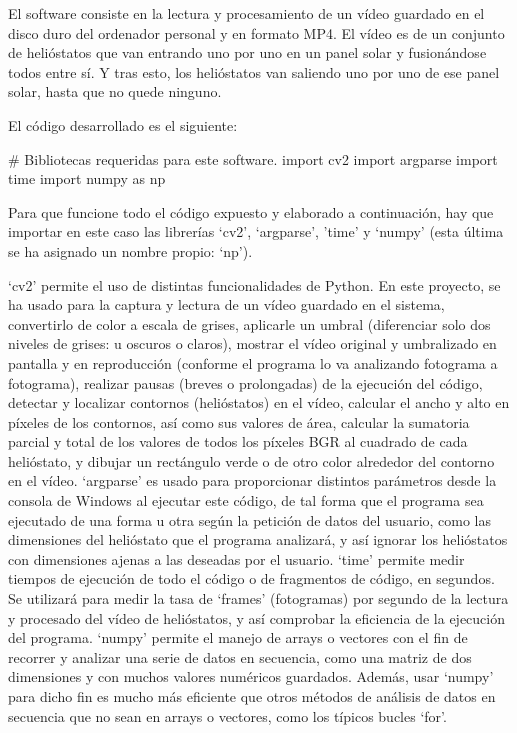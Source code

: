 El software consiste en la lectura y procesamiento de un vídeo guardado en el disco duro del ordenador personal y en formato MP4. El vídeo es de un conjunto de helióstatos que van entrando uno por uno en un panel solar y fusionándose todos entre sí. Y tras esto, los helióstatos van saliendo uno por uno de ese panel solar, hasta que no quede ninguno.

El código desarrollado es el siguiente:

\# Bibliotecas requeridas para este software.
import cv2
import argparse
import time
import numpy as np

Para que funcione todo el código expuesto y elaborado a continuación, hay que importar en este caso las librerías ‘cv2’, ‘argparse’, 'time' y ‘numpy’ (esta última se ha asignado un nombre propio: ‘np’).

‘cv2’ permite el uso de distintas funcionalidades de Python. En este proyecto, se ha usado para la captura y lectura de un vídeo guardado en el sistema, convertirlo de color a escala de grises, aplicarle un umbral (diferenciar solo dos niveles de grises: u oscuros o claros), mostrar el vídeo original y umbralizado en pantalla y en reproducción (conforme el programa lo va analizando fotograma a fotograma), realizar pausas (breves o prolongadas) de la ejecución del código, detectar y localizar contornos (helióstatos) en el vídeo, calcular el ancho y alto en píxeles de los contornos, así como sus valores de área, calcular la sumatoria parcial y total de los valores de todos los píxeles BGR al cuadrado de cada helióstato, y dibujar un rectángulo verde o de otro color alrededor del contorno en el vídeo.
‘argparse’ es usado para proporcionar distintos parámetros desde la consola de Windows al ejecutar este código, de tal forma que el programa sea ejecutado de una forma u otra según la petición de datos del usuario, como las dimensiones del helióstato que el programa analizará, y así ignorar los helióstatos con dimensiones ajenas a las deseadas por el usuario.
‘time’ permite medir tiempos de ejecución de todo el código o de fragmentos de código, en segundos. Se utilizará para medir la tasa de ‘frames’ (fotogramas) por segundo de la lectura y procesado del vídeo de helióstatos, y así comprobar la eficiencia de la ejecución del programa.
‘numpy’ permite el manejo de arrays o vectores con el fin de recorrer y analizar una serie de datos en secuencia, como una matriz de dos dimensiones y con muchos valores numéricos guardados. Además, usar ‘numpy’ para dicho fin es mucho más eficiente que otros métodos de análisis de datos en secuencia que no sean en arrays o vectores, como los típicos bucles ‘for’.


